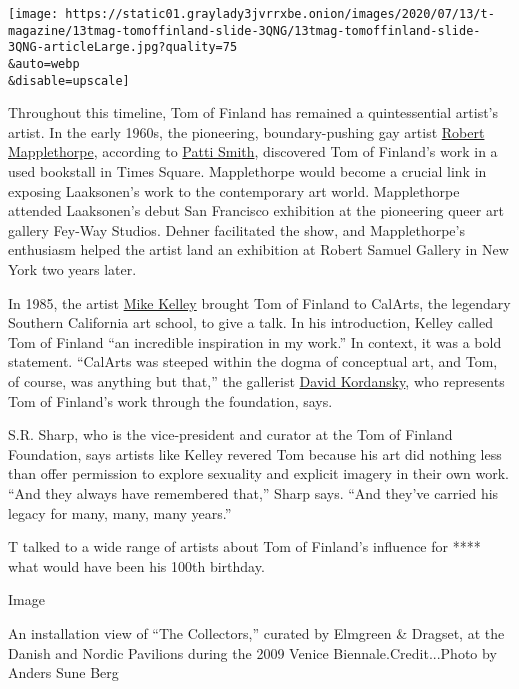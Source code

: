 \texttt{[image: https://static01.graylady3jvrrxbe.onion/images/2020/07/13/t-magazine/13tmag-tomoffinland-slide-3QNG/13tmag-tomoffinland-slide-3QNG-articleLarge.jpg?quality=75\\\&auto=webp\\\&disable=upscale]}

Throughout this timeline, Tom of Finland has remained a quintessential
artist's artist. In the early 1960s, the pioneering, boundary-pushing
gay artist
\href{https://www.nytimes3xbfgragh.onion/2018/11/23/t-magazine/robert-mappelthorpe-michael-cunningham-elif-batuman-hilton-als.html}{Robert
Mapplethorpe}, according to
\href{https://www.nytimes3xbfgragh.onion/2015/10/07/t-magazine/patti-smith-m-train-objects.html}{Patti
Smith}, discovered Tom of Finland's work in a used bookstall in Times
Square. Mapplethorpe would become a crucial link in exposing Laaksonen's
work to the contemporary art world. Mapplethorpe attended Laaksonen's
debut San Francisco exhibition at the pioneering queer art gallery
Fey-Way Studios. Dehner facilitated the show, and Mapplethorpe's
enthusiasm helped the artist land an exhibition at Robert Samuel Gallery
in New York two years later.

In 1985, the artist
\href{https://www.nytimes3xbfgragh.onion/2017/03/08/t-magazine/art/mike-kelley-mobile-homestead.html}{Mike
Kelley} brought Tom of Finland to CalArts, the legendary Southern
California art school, to give a talk. In his introduction, Kelley
called Tom of Finland ``an incredible inspiration in my work.'' In
context, it was a bold statement. ``CalArts was steeped within the dogma
of conceptual art, and Tom, of course, was anything but that,'' the
gallerist
\href{https://tmagazine.blogs.nytimes3xbfgragh.onion/2014/09/10/david-kordansky-art-dealer-profile/}{David
Kordansky}, who represents Tom of Finland's work through the foundation,
says.

S.R. Sharp, who is the vice-president and curator at the Tom of Finland
Foundation, says artists like Kelley revered Tom because his art did
nothing less than offer permission to explore sexuality and explicit
imagery in their own work. ``And they always have remembered that,''
Sharp says. ``And they've carried his legacy for many, many, many
years.''

T talked to a wide range of artists about Tom of Finland's influence for
**** what would have been his 100th birthday.

Image

An installation view of ``The Collectors,'' curated by Elmgreen \&
Dragset, at the Danish and Nordic Pavilions during the 2009 Venice
Biennale.Credit...Photo by Anders Sune Berg

